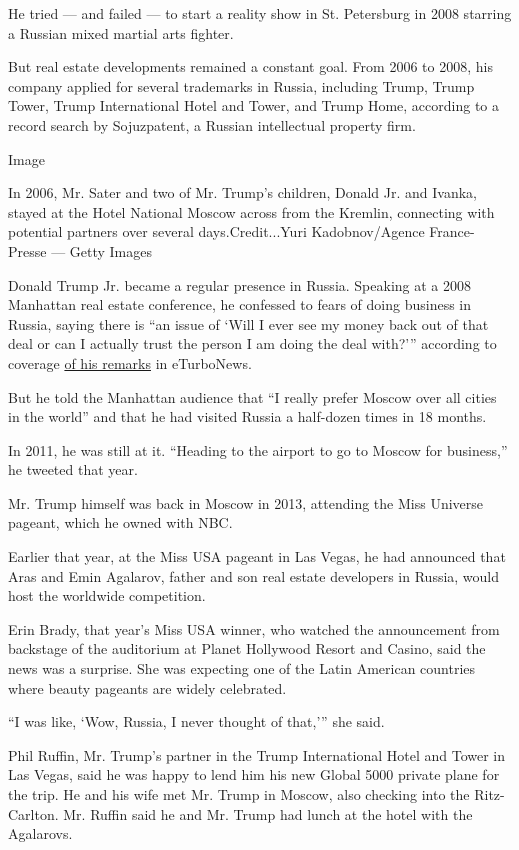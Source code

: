 He tried --- and failed --- to start a reality show in St. Petersburg in
2008 starring a Russian mixed martial arts fighter.

But real estate developments remained a constant goal. From 2006 to
2008, his company applied for several trademarks in Russia, including
Trump, Trump Tower, Trump International Hotel and Tower, and Trump Home,
according to a record search by Sojuzpatent, a Russian intellectual
property firm.

Image

In 2006, Mr. Sater and two of Mr. Trump's children, Donald Jr. and
Ivanka, stayed at the Hotel National Moscow across from the Kremlin,
connecting with potential partners over several days.Credit...Yuri
Kadobnov/Agence France-Presse --- Getty Images

Donald Trump Jr. became a regular presence in Russia. Speaking at a 2008
Manhattan real estate conference, he confessed to fears of doing
business in Russia, saying there is ``an issue of `Will I ever see my
money back out of that deal or can I actually trust the person I am
doing the deal with?''' according to coverage
\href{http://www.eturbonews.com/5008/executive-talk-donald-trump-jr-bullish-russia-and-few-emerging-ma}{of
his remarks} in eTurboNews.

But he told the Manhattan audience that ``I really prefer Moscow over
all cities in the world'' and that he had visited Russia a half-dozen
times in 18 months.

In 2011, he was still at it. ``Heading to the airport to go to Moscow
for business,'' he tweeted that year.

Mr. Trump himself was back in Moscow in 2013, attending the Miss
Universe pageant, which he owned with NBC.

Earlier that year, at the Miss USA pageant in Las Vegas, he had
announced that Aras and Emin Agalarov, father and son real estate
developers in Russia, would host the worldwide competition.

Erin Brady, that year's Miss USA winner, who watched the announcement
from backstage of the auditorium at Planet Hollywood Resort and Casino,
said the news was a surprise. She was expecting one of the Latin
American countries where beauty pageants are widely celebrated.

``I was like, `Wow, Russia, I never thought of that,''' she said.

Phil Ruffin, Mr. Trump's partner in the Trump International Hotel and
Tower in Las Vegas, said he was happy to lend him his new Global 5000
private plane for the trip. He and his wife met Mr. Trump in Moscow,
also checking into the Ritz-Carlton. Mr. Ruffin said he and Mr. Trump
had lunch at the hotel with the Agalarovs.

